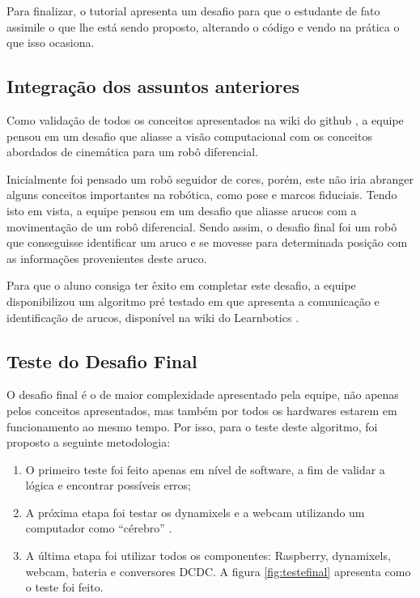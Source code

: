 Para finalizar, o tutorial apresenta um desafio para que o estudante de fato assimile o que lhe está sendo proposto, alterando o código e vendo na prática o que isso ocasiona. \cite{tutCinemat}



\subsection{Integração dos assuntos anteriores}
Como validação de todos os conceitos apresentados na wiki do github \cite{wikiLearn}, a equipe pensou em um desafio que aliasse a visão computacional com os conceitos abordados de cinemática para um robô diferencial. 

Inicialmente foi pensado um robô seguidor de cores, porém, este não iria abranger alguns conceitos importantes na robótica, como pose e marcos fiduciais. Tendo isto em vista, a equipe pensou em um desafio que aliasse arucos com a movimentação de um robô diferencial. Sendo assim, o desafio final foi um robô que conseguisse identificar um aruco e se movesse para determinada posição com as informações provenientes deste aruco.

Para que o aluno consiga ter êxito em completar este desafio, a equipe disponibilizou um algoritmo pré testado em que apresenta a comunicação e identificação de arucos, disponível na wiki do Learnbotics \cite{tutFin}.


\subsection{Teste do Desafio Final}

O desafio final é o de maior complexidade apresentado pela equipe, não apenas pelos conceitos apresentados, mas também por todos os hardwares estarem em funcionamento ao mesmo tempo. Por isso, para o teste deste algoritmo, foi proposto a seguinte metodologia:

\begin{enumerate}
	\item O primeiro teste foi feito apenas em nível de software, a fim de validar a lógica e encontrar possíveis erros;
	\item A próxima etapa foi testar os dynamixels e a webcam utilizando um computador como “cérebro” .
	\item A última etapa foi utilizar todos os componentes: Raspberry, dynamixels, webcam, bateria e conversores DCDC. A figura \ref{fig:testefinal} apresenta como o teste foi feito.
\end{enumerate}
 
